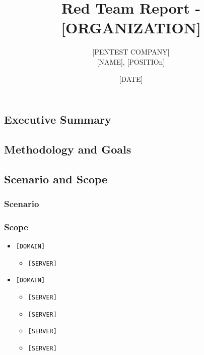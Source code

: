 \documentclass[
]{article}
\title{Red Team Report - [ORGANIZATION]}
\author{[PENTEST COMPANY] \\ \small [NAME], [POSITIOn] }
\date{[DATE]}
\providecommand{\tightlist}{%
  \setlength{\itemsep}{0pt}\setlength{\parskip}{0pt}}
\begin{document}
\begin{titlepage}
\maketitle
\end{titlepage}

\tableofcontents
\newpage

\subsection{Executive Summary}\label{executive-summary}

\lipsum[1-3]
\pagebreak

\subsection{Methodology and Goals}\label{methodology-and-goals}

\lipsum

\subsection{Scenario and Scope}\label{scenario-and-scope}

\subsubsection{Scenario}\label{scenario}

\lipsum[1-3]

\subsubsection{Scope}\label{scope}

\lipsum[2][2-6]

\begin{itemize}
\tightlist
\item
  \texttt{[DOMAIN]}
  \begin{itemize}
  \tightlist
  \item
    \texttt{[SERVER]}
  \end{itemize}
\item
  \texttt{[DOMAIN]}
  \begin{itemize}
  \tightlist
  \item
    \texttt{[SERVER]}
  \item
    \texttt{[SERVER]}
  \item
    \texttt{[SERVER]}
  \item
    \texttt{[SERVER]}
  \end{itemize}
\end{itemize}
\end{document}
